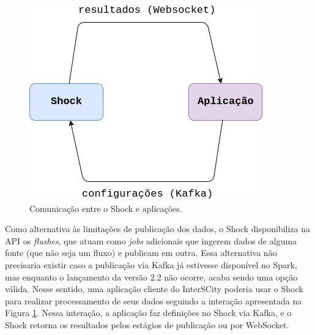 \begin{figure}[hbt]
  \centering
    \includegraphics[scale=0.5]{figuras/ligacoes.png}
  \caption{Comunicação entre o Shock e aplicações.}
  \label{fig:ligacoes}
\end{figure}

Como alternativa às limitações de publicação dos dados, o Shock
disponibiliza na API os \textit{flushes}, que atuam como \textit{jobs} adicionais
que ingerem dados de alguma fonte (que não seja um fluxo) e publicam
em outra. Essa alternativa não precisaria existir caso a publicação via Kafka
já estivesse disponível no Spark, mas enquanto o lançamento da versão 2.2 não
ocorre, acaba sendo uma opção válida. Nesse sentido, uma aplicação cliente do
InterSCity poderia usar o Shock para realizar processamento de seus dados
seguindo a interação apresentada na Figura \ref{fig:ligacoes}. Nessa interação, a
aplicação faz definições no Shock via Kafka, e o Shock retorna os resultados
pelos estágios de publicação ou por WebSocket.
